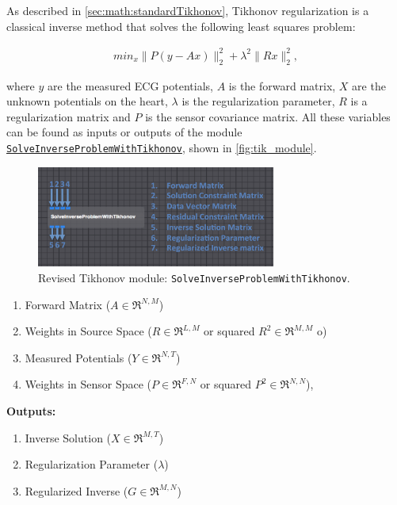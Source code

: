     As described in \autoref{sec:math:standardTikhonov}, Tikhonov regularization is a classical inverse method that solves the following least squares problem:
    \begin{center}
        \begin{eqnarray}
            min_{x} \| P (y - A x) \|^{2}_{2} + \lambda^{2} \| Rx \|^{2}_{2},
        \label{eq:inverseSec_tik_problem}
        \end{eqnarray}
    \end{center}
    where $y$ are the measured ECG potentials, $A$ is the forward matrix, $X$ are the unknown potentials on the heart, $\lambda$ is the regularization parameter, $R$ is a regularization matrix and $P$ is the sensor covariance matrix.
    All these variables can be found as inputs or outputs of the module \href{http://scirundocwiki.sci.utah.edu/SCIRunDocs/index.php/CIBC:Documentation:SCIRun:Reference:BioPSE:SolveInverseProblemWithTikhonov}{{\tt SolveInverseProblemWithTikhonov}}, shown in \autoref{fig:tik_module}.
    \begin{figure}
        \begin{center}
        \includegraphics[width=0.7\textwidth]{ECGToolkitGuide_figures/tik1.png}
        \caption{Revised Tikhonov module: {\tt SolveInverseProblemWithTikhonov}.  }
        \label{fig:tik_module}
        \end{center}
    \end{figure}
    \begin{enumerate}
        \item Forward Matrix ($A\in\Re^{N,M}$)
        \item Weights in Source Space ($R\in\Re^{L,M}$ or squared $R^2\in\Re^{M,M}$ o)
        \item Measured Potentials ($Y\in\Re^{N,T}$)
        \item Weights in Sensor Space ($P\in\Re^{F,N}$ or squared $P^2\in\Re^{N,N}$),
    \end{enumerate}
    {\bf Outputs:}
     \begin{enumerate}
        \item Inverse Solution ($X\in\Re^{M,T}$)
        \item Regularization Parameter ($\lambda$)
        \item Regularized Inverse ($G\in\Re^{M,N}$)
    \end{enumerate}

